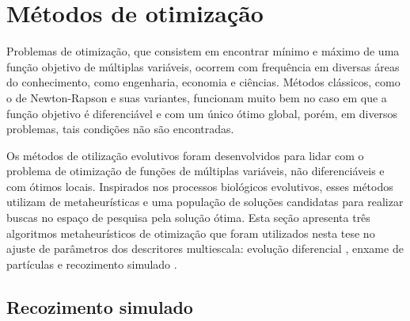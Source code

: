 \begin{comment}
\begin{equation}
D_f = 2 - \lim_{r \to 0}  \frac{\log{A(r)}}{\log{r}}.
\label{eq:df}
\end{equation}
Then, the derivative of th log-log curve for $N$ discrete values of radii $r_i>0$ gives 

\begin{equation}
MFD = \big(D_f(t_1)\text{, }D_f(t_2)\text{, }\ldots\text{ , }D_f(t_N)\big), 
\label{eq:dfm}
\end{equation}

\noindent where  $D_f(t) = 2 - \frac{du(t)}{dt}$, $t = \log{r}$ and $u(t) = \log{A(t)}$.

\end{comment}

\section{Métodos de otimização}

Problemas de otimização, que consistem em encontrar mínimo e máximo de uma função objetivo de múltiplas variáveis, ocorrem com frequência em diversas áreas do conhecimento, como engenharia, economia e ciências. Métodos clássicos, como o de Newton-Rapson e suas variantes, funcionam muito bem no caso em que a função objetivo é diferenciável e com um único ótimo global, porém, em diversos problemas, tais condições não são encontradas. 

Os métodos de otilização evolutivos foram desenvolvidos para lidar com o problema de otimização de funções de múltiplas  variáveis, não diferenciáveis e com ótimos locais. Inspirados nos processos biológicos evolutivos, esses métodos utilizam de metaheurísticas e uma população de soluções candidatas para realizar buscas no espaço de pesquisa pela solução ótima. Esta seção apresenta três algoritmos metaheurísticos de otimização que foram utilizados nesta tese no ajuste de parâmetros dos descritores multiescala: evolução diferencial  \cite{Storn:1007}, enxame de partículas  \cite{Yuhui:1998} e recozimento simulado \cite{Andries:2007}.

\subsection{Recozimento simulado}

